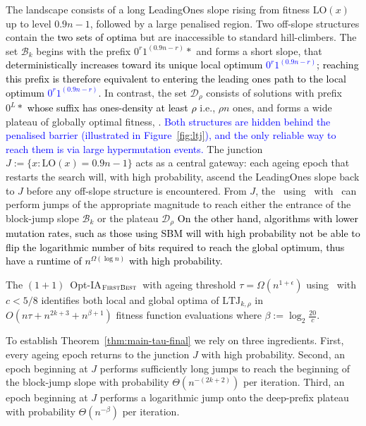 The landscape consists of a long LeadingOnes slope rising from fitness 
$\mathrm{LO}(x)$ up to level $0.9n-1$, followed by a large penalised region.  
Two off-slope structures contain the \textcolor{black}{two sets of optima} but are inaccessible to 
standard hill-climbers.  
The set $\mathcal{B}_k$ begins with the prefix $0^{r}1^{(0.9n-r)} *$ and forms a 
short slope,  that \textcolor{black}{deterministically increases toward its unique local optimum 
\textcolor{blue}{$0^{r}1^{(0.9n-r)}$}; reaching 
this prefix is therefore equivalent to entering the leading ones path to the local optimum\textcolor{blue}{
$0^{r}1^{(0.9n-r)}$}.}  
In contrast, the set $\mathcal{D}_\rho$ consists of solutions with prefix 
$0^{L} *$ \textcolor{black}{whose suffix has ones-density at least $\rho$} i.e., $\rho n$ ones, and forms a wide 
plateau of globally optimal fitness, .  
\textcolor{blue}{Both structures are hidden behind the penalised barrier (illustrated in
Figure~\ref{fig:ltj}), and the only reliable way to reach them is via large
hypermutation events.}  
The junction $J := \{x : \mathrm{LO}(x)=0.9n-1\}$ acts as a central gateway: 
each ageing epoch that restarts the search will, with high probability, ascend 
the LeadingOnes slope back to $J$ before any off-slope structure is encountered.  
From $J$, the \oneoneOPTIA~using \IPHfcm{}~with \linHD~can perform jumps of the 
appropriate magnitude to reach either the entrance of the block-jump slope $\mathcal{B}_k$ or 
the plateau $\mathcal{D}_\rho$  
\textcolor{black}{On the other hand, algorithms with lower mutation rates, such as those using SBM will with high probability not be able to flip the logarithmic number of bits required to reach the global optimum, thus have a runtime of $n^{\Omega(\log n)}$ with high probability.}

\begin{theorem} \label{thm:main-tau-final}
The  $(1+1)$~Opt-IA$_{\textsc{FirstBest}}$~with ageing threshold $\tau=\Omega(n^{1+\epsilon})$ using  \linHD~with $c<5/8$  identifies both local and global optima of  $\mathrm{LTJ}_{k,\rho}$ in
	$O(n\tau + n^{2k+3} + n^{\beta+1})$ fitness function evaluations	where $\beta := \log_2 \frac{20}{c}$.
\end{theorem}

To establish Theorem~\ref{thm:main-tau-final} we rely on three ingredients.
First, every ageing epoch returns to the junction $J$ with high probability.
Second, an epoch beginning at $J$ performs sufficiently long jumps to reach the beginning of the block-jump slope with probability $\Theta(n^{-(2k+2)})$ per iteration.
Third, an epoch beginning at $J$ performs a logarithmic jump onto the deep-prefix plateau with probability $\Theta(n^{-\beta})$ per iteration.

